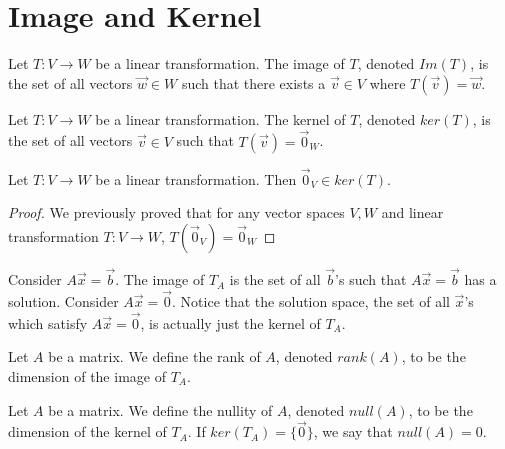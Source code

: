 \section{Image and Kernel}
\begin{definition}
    Let $T:V\to W$ be a linear transformation. The image of $T$, denoted $Im(T)$, is the set of all vectors $\vec{w}\in W$ such that there exists a $\vec{v}\in V$ where $T(\vec{v})=\vec{w}$.
\end{definition}
\begin{definition}
    Let $T:V\to W$ be a linear transformation. The kernel of $T$, denoted $ker(T)$, is the set of all vectors $\vec{v}\in V$ such that $T(\vec{v})=\vec{0}_W$.
\end{definition}
\begin{theorem}
    Let $T:V\to W$ be a linear transformation. Then $\vec{0}_V\in ker(T)$.
\end{theorem}
\begin{proof}
    We previously proved that for any vector spaces $V, W$ and linear transformation $T:V\to W$, $T(\vec{0}_V)=\vec{0}_W$
\end{proof}
Consider $A\vec{x}=\vec{b}$. The image of $T_A$ is the set of all $\vec{b}$'s such that $A\vec{x}=\vec{b}$ has a solution. Consider $A\vec{x}=\vec{0}$. Notice that the solution space, the set of all $\vec{x}$'s which satisfy $A\vec{x}=\vec{0}$, is actually just the kernel of $T_A$.
\begin{definition}
    Let $A$ be a matrix. We define the rank of $A$, denoted $rank(A)$, to be the dimension of the image of $T_A$.
\end{definition}
\begin{definition}
    Let $A$ be a matrix. We define the nullity of $A$, denoted $null(A)$, to be the dimension of the kernel of $T_A$. If $ker(T_A)=\{\vec{0}\}$, we say that $null(A)=0$.
\end{definition}
